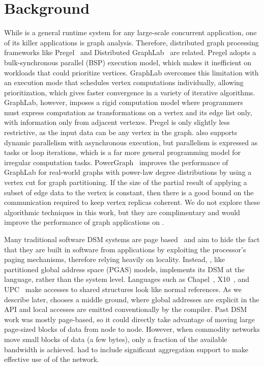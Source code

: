\section{Background}

\vspace{0.5ex}
 While \Grappa is a general runtime
system for any large-scale concurrent application, one of its killer
applications is graph analysis. Therefore, distributed graph processing
frameworks like Pregel~\cite{pregel:2010} and Distributed
GraphLab~\cite{distgraphlab:vldb12} are related. Pregel adopts a
bulk-synchronous parallel (BSP) execution model, which makes it inefficient on
workloads that could prioritize vertices. GraphLab overcomes this limitation
with an execution mode that schedules vertex computations individually,
allowing prioritization, which gives faster convergence in a variety of
iterative algorithms. GraphLab, however, imposes a rigid computation model
where programmers must express computation as transformations on a vertex and
its edge list only, with information only from adjacent vertexes. Pregel is
only slightly less restrictive, as the input data can be any vertex in the
graph. \Grappa also supports dynamic parallelism with asynchronous execution,
but parallelism is expressed as tasks or loop iterations, which is a far more
general programming model for irregular computation tasks.
PowerGraph~\cite{powergraph:osdi12} improves the performance of GraphLab for
real-world graphs with power-law degree distributions by using a vertex cut
for graph partitioning. If the size of the partial result of applying a subset
of edge data to the vertex is constant, then there is a good bound on the
communication required to keep vertex replicas coherent. We do not explore
these algorithmic techniques in this work, but they are complimentary and
would improve the performance of graph applications on \Grappa.

\vspace{0.5ex}
 Many traditional software
DSM systems are page based~\cite{Treadmarks,munin} and aim to hide the fact
that they are built in software from applications by exploiting the
processor's paging mechanisms, therefore relying heavily on locality. Instead,
\Grappa, like partitioned global address space (PGAS) models, implements its
DSM at the language, rather than the system level. Languages such as
Chapel~\cite{Chamberlain:2007}, X10~\cite{X10:2005}, and UPC~\cite{upc:2005}
make accesses to shared structures look like normal references. As we describe
later, \Grappa chooses a middle ground, where global addresses are explicit in
the API and local accesses are emitted conventionally by the compiler. Past
DSM work was mostly page-based, so it could directly take advantage of moving
large page-sized blocks of data from node to node. However, when commodity
networks move small blocks of data (a few bytes), only a fraction of the
available bandwidth is achieved. \Grappa had to include significant
aggregation support to make effective use of of the network.

